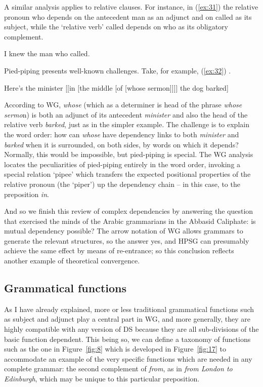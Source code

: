 \documentclass[output=paper]{langscibook}
\begin{document}
A similar analysis applies to relative clauses. For instance, in (\ref{ex:31}) the relative pronoun who depends on the antecedent man as an adjunct and on called as its subject, while the ‘relative verb’ called depends on who as its obligatory complement.

\begin{exe}
	\ex \label{ex:31} I knew the man who called.
\end{exe}

Pied-piping presents well-known challenges. Take, for example, (\ref{ex:32}) \citep[212]{ps2}.

\begin{exe}
	\ex \label{ex:32} Here’s the minister [[in [the middle [of [whose sermon]]]] the dog barked]
\end{exe}

According to WG, \emph{whose} (which as a determiner is head of the phrase \emph{whose sermo}n) is both an adjunct of its antecedent \emph{minister} and also the head of the relative verb \emph{barked}, just as in the simpler example. The challenge is to explain the word order: how can \emph{whose} have dependency links to both \emph{minister} and \emph{barked} when it is surrounded, on both sides, by words on which it depends? Normally, this would be impossible, but pied-piping is special. The WG analysis \citep{Hudson2018a} locates the peculiarities of pied-piping entirely in the word order, invoking a special relation ‘pipee’ which transfers the expected positional properties of the relative pronoun (the ‘piper’) up the dependency chain – in this case, to the preposition \emph{in}.

And so we finish this review of complex dependencies by answering the question that exercised the minds of the Arabic grammarians in the Abbasid Ca\-liph\-ate: is mutual dependency possible? The arrow notation of WG allows grammars to generate the relevant structures, so the answer yes, and HPSG can presumably achieve the same effect by means of re-entrance; so this conclusion reflects another example of theoretical convergence.


\subsection{Grammatical functions}
\label{sec:5.3}

As I have already explained, more or less traditional grammatical functions such as subject and adjunct play a central part in WG, and more generally, they are highly compatible with any version of DS because they are all sub-divisions of the basic function dependent. This being so, we can define a taxonomy of functions such as the one in Figure~\ref{fig:8} which is developed in Figure~\ref{fig:17} to accommodate an example of the very specific functions which are needed in any complete grammar: the second complement of \emph{from}, as in \emph{from London to Edinburgh}, which may be unique to this particular preposition.
\end{document}
